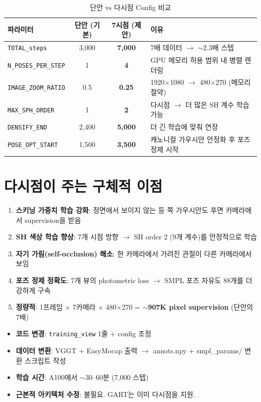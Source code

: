 \documentclass[11pt, a4paper]{report}
\begin{document}
\begin{table}[H]
\centering
\caption{단안 vs 다시점 Config 비교}
\renewcommand{\arraystretch}{1.3}
\begin{tabular}{l c c p{4cm}}
\toprule
\textbf{파라미터} & \textbf{단안 (기본)} & \textbf{7시점 (제안)} & \textbf{이유} \\
\midrule
\texttt{TOTAL\_steps} & 3,000 & \textbf{7,000} & 7배 데이터 $\rightarrow$ $\sim$2.3배 스텝 \\
\texttt{N\_POSES\_PER\_STEP} & 1 & \textbf{4} & GPU 메모리 허용 범위 내 병렬 렌더링 \\
\texttt{IMAGE\_ZOOM\_RATIO} & 0.5 & \textbf{0.25} & 1920$\times$1080 $\rightarrow$ 480$\times$270 (메모리 절약) \\
\texttt{MAX\_SPH\_ORDER} & 1 & \textbf{2} & 다시점 $\rightarrow$ 더 많은 SH 계수 학습 가능 \\
\texttt{DENSIFY\_END} & 2,400 & \textbf{5,000} & 더 긴 학습에 맞춰 연장 \\
\texttt{POSE\_OPT\_START} & 1,500 & \textbf{3,500} & 캐노니컬 가우시안 안정화 후 포즈 정제 시작 \\
\bottomrule
\end{tabular}
\end{table}


\section{다시점이 주는 구체적 이점}

\begin{enumerate}[leftmargin=*]
  \item \textbf{스키닝 가중치 학습 강화}: 정면에서 보이지 않는 등 쪽 가우시안도 후면 카메라에서 supervision을 받음
  \item \textbf{SH 색상 학습 향상}: 7개 시점 방향 $\rightarrow$ SH order 2 (9개 계수)를 안정적으로 학습
  \item \textbf{자기 가림(self-occlusion) 해소}: 한 카메라에서 가려진 관절이 다른 카메라에서 보임
  \item \textbf{포즈 정제 정확도}: 7개 뷰의 photometric loss $\rightarrow$ SMPL 포즈 자유도 88개를 더 강하게 구속
  \item \textbf{정량적}: 1프레임 $\times$ 7카메라 $\times$ 480$\times$270 = \textbf{$\sim$907K pixel supervision} (단안의 7배)
\end{enumerate}

\begin{summary}[title={다시점 확장 요약}]
\begin{itemize}[leftmargin=*]
  \item \textbf{코드 변경}: \texttt{training\_view} 1줄 + config 조정
  \item \textbf{데이터 변환}: VGGT + EasyMocap 출력 $\rightarrow$ annots.npy + smpl\_params/ 변환 스크립트 작성
  \item \textbf{학습 시간}: A100에서 $\sim$30--60분 (7,000 스텝)
  \item \textbf{근본적 아키텍처 수정}: 불필요. GART는 이미 다시점을 지원.
\end{itemize}
\end{summary}
\end{document}
